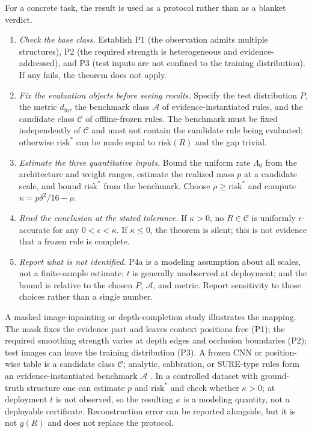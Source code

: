\documentclass[twoside,11pt]{article}
\begin{document}
For a concrete task, the result is used as a protocol rather than as a blanket verdict.

\begin{enumerate}
\item \emph{Check the base class.} Establish P1 (the observation admits multiple structures), P2 (the required strength is heterogeneous and evidence-addressed), and P3 (test inputs are not confined to the training distribution). If any fails, the theorem does not apply.
\item \emph{Fix the evaluation objects before seeing results.} Specify the test distribution $P$, the metric $d_{\mathrm{in}}$, the benchmark class $\mathcal{A}$ of evidence-instantiated rules, and the candidate class $\mathcal{C}$ of offline-frozen rules. The benchmark must be fixed independently of $\mathcal{C}$ and must not contain the candidate rule being evaluated; otherwise $\mathrm{risk}^*$ can be made equal to $\mathrm{risk}(R)$ and the gap trivial.
\item \emph{Estimate the three quantitative inputs.} Bound the uniform rate $\Lambda_0$ from the architecture and weight ranges, estimate the realized mass $p$ at a candidate scale, and bound $\mathrm{risk}^*$ from the benchmark. Choose $\rho\ge\mathrm{risk}^*$ and compute $\kappa=p\delta^2/16-\rho$.
\item \emph{Read the conclusion at the stated tolerance.} If $\kappa>0$, no $R\in\mathcal{C}$ is uniformly $\epsilon$-accurate for any $0<\epsilon<\kappa$. If $\kappa\le0$, the theorem is silent; this is not evidence that a frozen rule is complete.
\item \emph{Report what is not identified.} P4a is a modeling assumption about all scales, not a finite-sample estimate; $t$ is generally unobserved at deployment; and the bound is relative to the chosen $P$, $\mathcal{A}$, and metric. Report sensitivity to those choices rather than a single number.
\end{enumerate}

A masked image-inpainting or depth-completion study illustrates the mapping. The mask fixes the evidence part and leaves context positions free (P1); the required smoothing strength varies at depth edges and occlusion boundaries (P2); test images can leave the training distribution (P3). A frozen CNN or position-wise table is a candidate class $\mathcal{C}$; analytic, calibration, or SURE-type rules form an evidence-instantiated benchmark $\mathcal{A}$ \citep{stein1981,romano2017}. In a controlled dataset with ground-truth structure one can estimate $p$ and $\mathrm{risk}^*$ and check whether $\kappa>0$; at deployment $t$ is not observed, so the resulting $\kappa$ is a modeling quantity, not a deployable certificate. Reconstruction error can be reported alongside, but it is not $g(R)$ and does not replace the protocol.
\end{document}

